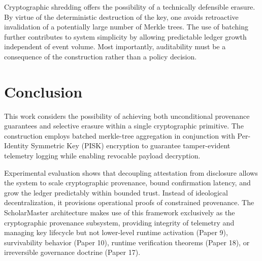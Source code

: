 \documentclass[conference]{IEEEtran}
\begin{document}
Cryptographic shredding offers the possibility of a technically defensible erasure. By virtue of the deterministic destruction of the key, one avoids retroactive invalidation of a potentially large number of Merkle trees. The use of batching further contributes to system simplicity by allowing predictable ledger growth independent of event volume. Most importantly, auditability must be a consequence of the construction rather than a policy decision.

\section{Conclusion}

This work considers the possibility of achieving both unconditional provenance guarantees and selective erasure within a single cryptographic primitive. The construction employs batched merkle-tree aggregation in conjunction with Per-Identity Symmetric Key (PISK) encryption to guarantee tamper-evident telemetry logging while enabling revocable payload decryption.

Experimental evaluation shows that decoupling attestation from disclosure allows the system to scale cryptographic provenance, bound confirmation latency, and grow the ledger predictably within bounded trust. Instead of ideological decentralization, it provisions operational proofs of constrained provenance. The ScholarMaster architecture makes use of this framework exclusively as the cryptographic provenance subsystem, providing integrity of telemetry and managing key lifecycle but not lower-level runtime activation (Paper 9), survivability behavior (Paper 10), runtime verification theorems (Paper 18), or irreversible governance doctrine (Paper 17).
\end{document}
